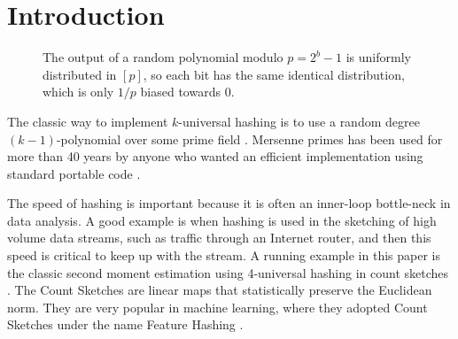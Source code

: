 \section{Introduction}

\begin{figure}
   \centering
   \caption{The output of a random polynomial modulo $p=2^b-1$ is uniformly distributed in $[p]$, so each bit has the same identical distribution, which is only $1/p$ biased towards 0.}
   \label{fig:bits}
\end{figure}

The classic way to implement $k$-universal hashing is to use a random
degree $(k-1)$-polynomial over some prime field
\cite{wegman81kwise}. Mersenne primes has been used for more than 40
years by anyone who
wanted an efficient implementation
using standard portable code \cite{carter77universal}.

The speed of hashing is important because it is often an inner-loop
bottle-neck in data analysis. A good example is when hashing is used
in the sketching of high volume data streams, such as traffic through
an Internet router, and then this speed is critical to keep up with
the stream. A running example in this paper is the classic second
moment estimation using 4-universal hashing in count sketches
\cite{charikar04count-sketch}. The Count Sketches are linear maps that
statistically preserve the Euclidean norm. They are very popular in
machine learning, where they adopted Count Sketches under the name
Feature Hashing \cite{moody1989fast,weinberger2009feature}.

